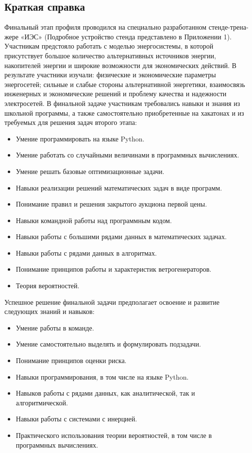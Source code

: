 \subsection*{Краткая справка}

Финальный этап профиля проводился на специально разработанном стенде-трена-
жере «ИЭС» (Подробное устройство стенда представлено в Приложении 1). Участникам предстояло работать с моделью энергосистемы, в которой присутствует большое количество альтернативных источников энергии, накопителей энергии и широкие возможности для экономических действий. В результате участники изучали: физические и экономические параметры энергосетей; сильные и слабые стороны альтернативной энергетики, взаимосвязь инженерных и экономические решений и проблему качества и надежности электросетей.
В финальной задаче участникам требовались навыки и знания из школьной программы, а также самостоятельно приобретенные на хакатонах и из требуемых для решения задач второго этапа:
\begin{itemize}
    \item Умение программировать на языке Python.
    \item Умение работать со случайными величинами в программных вычислениях.
    \item Умение решать базовые оптимизационные задачи.
    \item Навыки реализации решений математических задач в виде программ.
    \item Понимание правил и решения закрытого аукциона первой цены.
    \item Навыки командной работы над программным кодом.
    \item Навыки работы с большими рядами данных в математических задачах.
    \item Навыки работы с рядами данных в алгоритмах.
    \item Понимание принципов работы и характеристик ветрогенераторов.
    \item Теория вероятностей.
\end{itemize}

Успешное решение финальной задачи предполагает освоение и развитие следующих знаний и навыков:
\begin{itemize}
    \item Умение работы в команде.
    \item Умение самостоятельно выделять и формулировать подзадачи.
    \item Понимание принципов оценки риска.
    \item Навыки программирования, в том числе на языке Python.
    \item Навыков работы с рядами данных, как аналитической, так и алгоритмической.
    \item Навыки работы с системами с инерцией.
    \item Практического использования теории вероятностей, в том числе в программных вычислениях.
\end{itemize}
